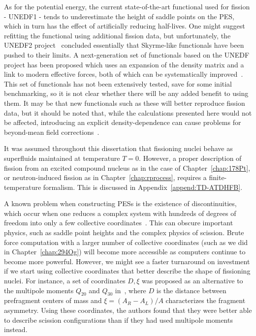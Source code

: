 As for the potential energy, the current state-of-the-art functional used for fission - UNEDF1 - tends to underestimate the height of saddle points on the PES, which in turn has the effect of artificially reducing half-lives. One might suggest refitting the functional using additional fission data, but unfortunately, the UNEDF2 project~\cite{Kortelainen2014} concluded essentially that Skyrme-like functionals have been pushed to their limits. A next-generation set of functionals based on the UNEDF project has been proposed which uses an expansion of the density matrix and a link to modern effective forces, both of which can be systematically improved~\cite{NavarroPerez2018}. This set of functionals has not been extensively tested, save for some initial benchmarking, so it is not clear whether there will be any added benefit to using them. It may be that new functionals such as these will better reproduce fission data, but it should be noted that, while the calculations presented here would not be affected, introducing an explicit density-dependence can cause problems for beyond-mean field corrections~\cite{duguet2009, dobaczewski2007, anguiano2001}. %

It was assumed throughout this dissertation that fissioning nuclei behave as superfluids maintained at temperature $T=0$. However, a proper description of fission from an excited compound nucleus as in the case of Chapter~\ref{chap:178Pt}, or neutron-induced fission as in Chapter~\ref{chap:rprocess}, requires a finite-temperature formalism. This is discussed in Appendix~\ref{append:TD-ATDHFB}.

A known problem when constructing PESs is the existence of discontinuities, which occur when one reduces a complex system with hundreds of degrees of freedom into only a few collective coordinates~\cite{dubray2012}. This can obscure important physics, such as saddle point heights and the complex physics of scission. Brute force computation with a larger number of collective coordinates (such as we did in Chapter~\ref{chap:294Og}) will become more accessible as computers continue to become more powerful. However, we might see a faster turnaround on investment if we start using collective coordinates that better describe the shape of fissioning nuclei. For instance, a set of coordinates $D, \xi$ was proposed as an alternative to the multipole moments $Q_{20}$ and $Q_{30}$ in~\cite{younes2012}, where $D$ is the distance between prefragment centers of mass and $\xi = (A_R-A_L)/A$ characterizes the fragment asymmetry. Using these coordinates, the authors found that they were better able to describe scission configurations than if they had used multipole moments instead. %


